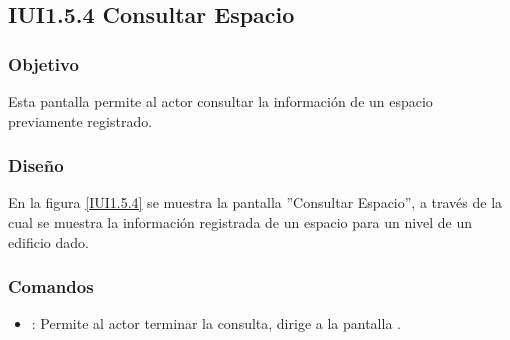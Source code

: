 \subsection{IUI1.5.4 Consultar Espacio}

\subsubsection{Objetivo}
	Esta pantalla permite al actor consultar la información de un espacio previamente registrado.

\subsubsection{Diseño}

	En la figura \ref{IUI1.5.4} se muestra la pantalla ''Consultar Espacio'', a través de la cual se muestra la información registrada de un espacio para un nivel de un edificio dado.


\subsubsection{Comandos}
\begin{itemize}
	
	\item {}: Permite al actor terminar la consulta, dirige a la pantalla .
\end{itemize}
